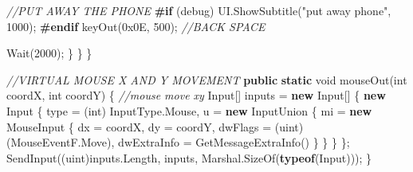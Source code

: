 \documentclass[
  openany]{book}
\newenvironment{Shaded}{\begin{snugshade}}{\end{snugshade}}
\newcommand{\BaseNTok}[1]{\textcolor[rgb]{0.00,0.00,0.81}{#1}}
\newcommand{\CommentTok}[1]{\textcolor[rgb]{0.56,0.35,0.01}{\textit{#1}}}
\newcommand{\DataTypeTok}[1]{\textcolor[rgb]{0.13,0.29,0.53}{#1}}
\newcommand{\DecValTok}[1]{\textcolor[rgb]{0.00,0.00,0.81}{#1}}
\newcommand{\FunctionTok}[1]{\textcolor[rgb]{0.00,0.00,0.00}{#1}}
\newcommand{\KeywordTok}[1]{\textcolor[rgb]{0.13,0.29,0.53}{\textbf{#1}}}
\newcommand{\NormalTok}[1]{#1}
\newcommand{\StringTok}[1]{\textcolor[rgb]{0.31,0.60,0.02}{#1}}
\begin{document}
\begin{Shaded}
\begin{Highlighting}[]
                    \CommentTok{//PUT AWAY THE PHONE}
\KeywordTok{#if}\NormalTok{ (debug)}
\NormalTok{                    UI.}\FunctionTok{ShowSubtitle}\NormalTok{(}\StringTok{"put away phone"}\NormalTok{, }\DecValTok{1000}\NormalTok{);}
\KeywordTok{#endif}
                    \FunctionTok{keyOut}\NormalTok{(}\BaseNTok{0x0E}\NormalTok{, }\DecValTok{500}\NormalTok{); }\CommentTok{//BACK SPACE}
                    
                    \FunctionTok{Wait}\NormalTok{(}\DecValTok{2000}\NormalTok{);}
\NormalTok{                \}}
\NormalTok{            \}}
\NormalTok{        \}}

        
        \CommentTok{//VIRTUAL MOUSE X AND Y MOVEMENT}
        \KeywordTok{public} \KeywordTok{static} \DataTypeTok{void} \FunctionTok{mouseOut}\NormalTok{(}\DataTypeTok{int}\NormalTok{ coordX, }\DataTypeTok{int}\NormalTok{ coordY)}
\NormalTok{        \{}
            \CommentTok{//mouse move xy}
\NormalTok{            Input[] inputs = }\KeywordTok{new}\NormalTok{ Input[]}
\NormalTok{            \{}
                \KeywordTok{new}\NormalTok{ Input}
\NormalTok{                \{}
\NormalTok{                    type = (}\DataTypeTok{int}\NormalTok{) InputType.}\FunctionTok{Mouse}\NormalTok{,}
\NormalTok{                    u = }\KeywordTok{new}\NormalTok{ InputUnion}
\NormalTok{                    \{}
\NormalTok{                        mi = }\KeywordTok{new}\NormalTok{ MouseInput}
\NormalTok{                        \{}
\NormalTok{                            dx = coordX,}
\NormalTok{                            dy = coordY,}
\NormalTok{                            dwFlags = (}\DataTypeTok{uint}\NormalTok{)(MouseEventF.}\FunctionTok{Move}\NormalTok{),}
\NormalTok{                            dwExtraInfo = }\FunctionTok{GetMessageExtraInfo}\NormalTok{()}
\NormalTok{                        \}}
\NormalTok{                    \}}
\NormalTok{                \}}
\NormalTok{            \};}
            \FunctionTok{SendInput}\NormalTok{((}\DataTypeTok{uint}\NormalTok{)inputs.}\FunctionTok{Length}\NormalTok{, inputs, Marshal.}\FunctionTok{SizeOf}\NormalTok{(}\KeywordTok{typeof}\NormalTok{(Input)));}
\NormalTok{        \}}


\end{Highlighting}
\end{Shaded}
\end{document}
